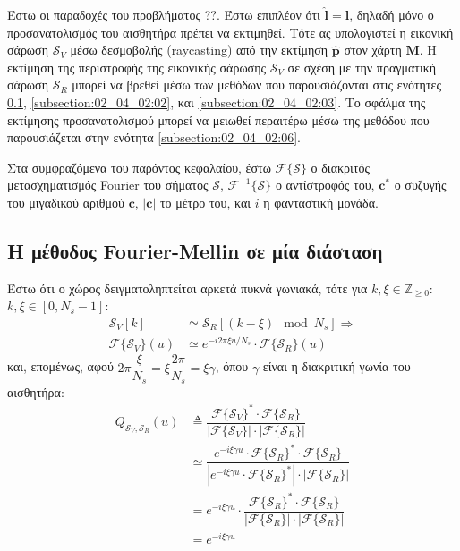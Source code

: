 Έστω οι παραδοχές του προβλήματος ??. Έστω επιπλέον ότι $\hat{\bm{l}} =
\bm{l}$, δηλαδή μόνο ο προσανατολισμός του αισθητήρα πρέπει να εκτιμηθεί. Τότε
ας υπολογιστεί η εικονική σάρωση $\mathcal{S}_V$ μέσω δεσμοβολής (raycasting)
από την εκτίμηση $\hat{\bm{p}}$ στον χάρτη $\bm{M}$. Η εκτίμηση της περιστροφής
της εικονικής σάρωσης $\mathcal{S}_V$ σε σχέση με την πραγματική σάρωση
$\mathcal{S}_R$ μπορεί να βρεθεί μέσω των μεθόδων που παρουσιάζονται στις
ενότητες \ref{subsection:02_04_02:01}, \ref{subsection:02_04_02:02}, και
\ref{subsection:02_04_02:03}. Το σφάλμα της εκτίμησης προσανατολισμού μπορεί να
μειωθεί περαιτέρω μέσω της μεθόδου που παρουσιάζεται στην ενότητα
\ref{subsection:02_04_02:06}.

Στα συμφραζόμενα του παρόντος κεφαλαίου, έστω $\mathcal{F}\{\mathcal{S}\}$ ο
διακριτός μετασχηματισμός Fourier του σήματος $\mathcal{S}$,
$\mathcal{F}^{-1}\{\mathcal{S}\}$ ο αντίστροφός του, $\bm{c}^\ast$ ο συζυγής
του μιγαδικού αριθμού $\bm{c}$, $|\bm{c}|$ το μέτρο του, και $i$ η φανταστική
μονάδα.

\subsection{Η μέθοδος Fourier-Mellin σε μία διάσταση}
\label{subsection:02_04_02:01}

Έστω ότι ο χώρος δειγματοληπτείται αρκετά πυκνά γωνιακά, τότε για
$k,\xi \in \mathbb{Z}_{\geq 0}$: $k,\xi \in [0, N_s-1]$:
\begin{align}
  \mathcal{S}_V[k] &\simeq \mathcal{S}_R[(k - \xi) \mod N_s] \Rightarrow \nonumber \\
  \mathcal{F}\{\mathcal{S}_V\}(u) &\simeq e^{-i 2\pi \xi u / N_s} \cdot \mathcal{F}\{\mathcal{S}_R\}(u) \nonumber
\end{align}
και, επομένως, αφού $2\pi \dfrac{\xi}{N_s} = \xi \dfrac{2\pi}{N_s} = \xi \gamma$,
όπου $\gamma$ είναι η διακριτική γωνία του αισθητήρα:
\begin{align}
  Q_{\mathcal{S}_V, \mathcal{S}_R}(u) & \triangleq \dfrac{\mathcal{F}\{\mathcal{S}_V\}^{\ast} \cdot \mathcal{F}\{\mathcal{S}_R\}}{|\mathcal{F}\{\mathcal{S}_V\}| \cdot |\mathcal{F}\{\mathcal{S}_R\}|} \nonumber \\
  &\simeq \dfrac{e^{-i \xi \gamma u} \cdot \mathcal{F}\{\mathcal{S}_R\}^\ast \cdot \mathcal{F}\{\mathcal{S}_R\}}{|e^{- i \xi \gamma u} \cdot \mathcal{F}\{\mathcal{S}_R\}^\ast | \cdot | \mathcal{F}\{\mathcal{S}_R\}|} \nonumber \\
  &= e^{-i \xi \gamma u} \cdot \dfrac{\mathcal{F}\{\mathcal{S}_R\}^\ast \cdot \mathcal{F}\{\mathcal{S}_R\}}{|\mathcal{F}\{\mathcal{S}_R\} | \cdot | \mathcal{F}\{\mathcal{S}_R\}|} \nonumber \\
  &= e^{-i \xi \gamma u}
  \label{eq:Q0}
\end{align}

